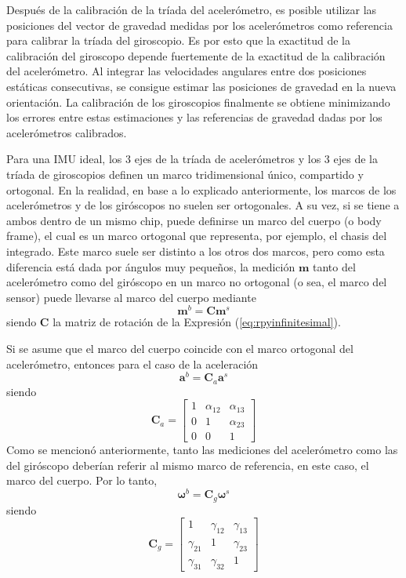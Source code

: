 Después de la calibración de la tríada del acelerómetro, es posible utilizar las posiciones del vector de gravedad medidas por los acelerómetros como referencia para calibrar la tríada del giroscopio. Es por esto que la exactitud de la calibración del giroscopo depende fuertemente de la exactitud de la calibración del acelerómetro. Al integrar las velocidades angulares entre dos posiciones estáticas consecutivas, se consigue estimar las posiciones de gravedad en la nueva orientación. La calibración de los giroscopios finalmente se obtiene minimizando los errores entre estas estimaciones y las referencias de gravedad dadas por los acelerómetros calibrados.

Para una IMU ideal, los 3 ejes de la tríada de acelerómetros y los 3 ejes de la tríada de giroscopios definen un marco tridimensional único, compartido y ortogonal. En la realidad, en base a lo explicado anteriormente, los marcos de los acelerómetros y de los giróscopos no suelen ser ortogonales. A su vez, si se tiene a ambos dentro de un mismo chip, puede definirse un marco del cuerpo (o body frame), el cual es un marco ortogonal que representa, por ejemplo, el chasis del integrado. Este marco suele ser distinto a los otros dos marcos, pero como esta diferencia está dada por ángulos muy pequeños, la medición $\bm{m}$ tanto del acelerómetro como del giróscopo en un marco no ortogonal (o sea, el marco del sensor) puede llevarse al marco del cuerpo mediante
\begin{equation}
    \bm{m}^b = \bm{C}\bm{m}^s
\end{equation}
siendo $\bm{C}$ la matriz de rotación de la Expresión (\ref{eq:rpyinfinitesimal}).

Si se asume que el marco del cuerpo coincide con el marco ortogonal del acelerómetro, entonces para el caso de la aceleración
\begin{equation}
    \bm{a}^b = \bm{C}_a\bm{a}^s
\end{equation}
siendo
\begin{equation}
    \bm{C}_a =
    \begin{bmatrix}
        1 & \alpha_{12} & \alpha_{13} \\
        0 & 1 & \alpha_{23} \\
        0 & 0 & 1
    \end{bmatrix}
\end{equation}
Como se mencionó anteriormente, tanto las mediciones del acelerómetro como las del giróscopo deberían referir al mismo marco de referencia, en este caso, el marco del cuerpo. Por lo tanto,
\begin{equation}
    \bm{\omega}^b = \bm{C}_g\bm{\omega}^s
\end{equation}
siendo
\begin{equation}
    \bm{C}_g =
    \begin{bmatrix}
        1 & \gamma_{12} & \gamma_{13} \\
        \gamma_{21} & 1 & \gamma_{23} \\
        \gamma_{31} & \gamma_{32} & 1
    \end{bmatrix}
\end{equation}

